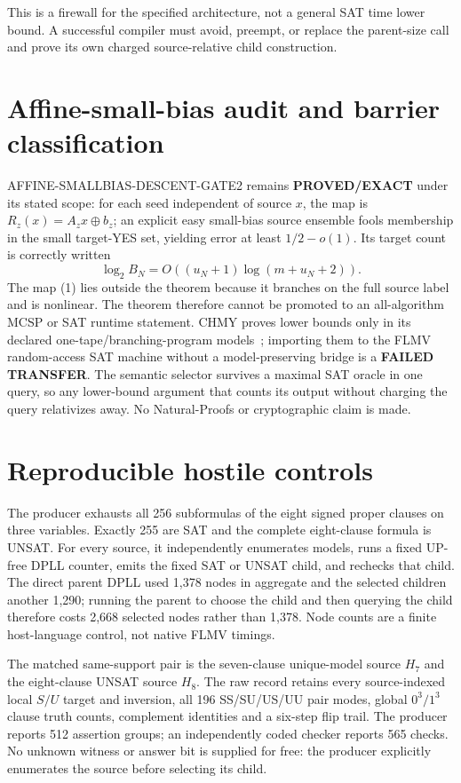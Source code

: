 \documentclass[11pt]{article}
\begin{document}
This is a firewall for the specified architecture, not a general SAT time
lower bound.  A successful compiler must avoid, preempt, or replace the
parent-size call and prove its own charged source-relative child construction.

\section{Affine-small-bias audit and barrier classification}
AFFINE-SMALLBIAS-DESCENT-GATE2 remains \textbf{PROVED/EXACT} under its stated
scope: for each seed independent of source $x$, the map is
$R_z(x)=A_zx\oplus b_z$; an explicit easy small-bias source ensemble fools
membership in the small target-YES set, yielding error at least
$1/2-o(1)$.  Its target count is correctly written
\[
 \log_2 B_N=O((u_N+1)\log(m+u_N+2)).
\]
The map (1) lies outside the theorem because it branches on the full source
label and is nonlinear.  The theorem therefore cannot be promoted to an
all-algorithm MCSP or SAT runtime statement.  CHMY proves lower bounds only in
its declared one-tape/branching-program models~\cite{chmy}; importing them to
the FLMV random-access SAT machine without a model-preserving bridge is a
\textbf{FAILED TRANSFER}.  The semantic selector survives a maximal SAT oracle
in one query, so any lower-bound argument that counts its output without
charging the query relativizes away.  No Natural-Proofs or cryptographic claim
is made.

\section{Reproducible hostile controls}
The producer exhausts all 256 subformulas of the eight signed proper clauses on
three variables.  Exactly 255 are SAT and the complete eight-clause formula is
UNSAT.  For every source, it independently enumerates models, runs a fixed
UP-free DPLL counter, emits the fixed SAT or UNSAT child, and rechecks that
child.  The direct parent DPLL used 1,378 nodes in aggregate and the selected
children another 1,290; running the parent to choose the child and then querying
the child therefore costs 2,668 selected nodes rather than 1,378.  Node counts
are a finite host-language control, not native FLMV timings.

The matched same-support pair is the seven-clause unique-model source $H_7$
and the eight-clause UNSAT source $H_8$.  The raw record retains every
source-indexed local $S/U$ target and inversion, all 196 SS/SU/US/UU pair modes,
global $0^3/1^3$ clause truth counts, complement identities and a six-step flip
trail.  The producer reports 512 assertion groups; an independently coded
checker reports 565 checks.  No unknown witness or answer bit is supplied for
free: the producer explicitly enumerates the source before selecting its child.
\end{document}

